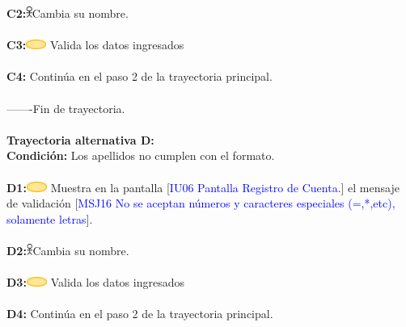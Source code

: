                         \textbf{C2:}\includegraphics[width=0.0150\textwidth]{Figuras/persona.png}Cambia su nombre.\\\\
                        \textbf{C3:}\includegraphics[width=0.0500\textwidth]{Figuras/sistema.png} Valida los datos ingresados\\\\
                        
                        \textbf{C4:} Continúa en el paso 2 de la trayectoria principal. \\\\
        -------Fin de  trayectoria. \\\\

                    \textbf{Trayectoria alternativa D:}\\
                        \textbf{Condición:} Los apellidos no cumplen con el formato.\\\\
                        \textbf{D1:}\includegraphics[width=0.0500\textwidth]{Figuras/sistema.png} Muestra en la pantalla [\textcolor{blue}{IU06 Pantalla Registro de Cuenta}.] el mensaje de validación [\textcolor{blue}{MSJ16 No se aceptan números y caracteres especiales (=,*,etc), solamente letras}].  \\\\
                        \textbf{D2:}\includegraphics[width=0.0150\textwidth]{Figuras/persona.png}Cambia su nombre.\\\\
                        \textbf{D3:}\includegraphics[width=0.0500\textwidth]{Figuras/sistema.png} Valida los datos ingresados\\\\  
                        \textbf{D4:} Continúa en el paso 2 de la trayectoria principal. \\\\
       
